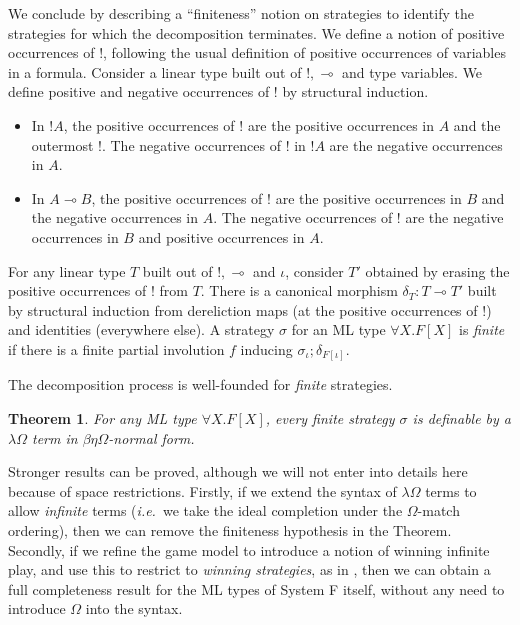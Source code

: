 \documentclass[a4paper,11pt]{article}
\newtheorem{theorem}[proposition]{Theorem}
\newcommand{\ie}{\textit{i.e.}\ }
\newcommand{\linimpl}{\multimap}
\newcommand{\lambdaomega}{\lambda\Omega}
\begin{document}
We conclude by describing a ``finiteness'' notion on strategies to
identify the strategies for which the decomposition terminates. We
define a notion of positive occurrences of $!$, following the
usual definition of positive occurrences of variables in a
formula. Consider a linear type built out of $!, \linimpl$ and
type variables.  We define positive and negative occurrences of
$!$ by structural induction.
\begin{itemize}
\item In $!A$, the positive occurrences of $!$ are the positive
occurrences in
$A$ and the outermost $!$.  The negative occurrences of $!$ in
$!A$ are the negative occurrences in $A$.
\item In $A \linimpl B$, the positive occurrences of $!$ are the
positive occurrences in $B$ and the negative occurrences in $A$.
The negative occurrences of $!$ are the negative occurrences in
$B$ and positive occurrences in $A$.
\end{itemize}
For any linear type $T$ built out of $!, \linimpl$ and $\iota$, consider $T'$ obtained by erasing the positive occurrences
of $!$ from $T$.  There is a canonical morphism $\delta_T : T \linimpl T'$
built by structural induction from dereliction maps (at the positive
occurrences of $!$) and identities (everywhere else). A strategy
$\sigma$ for an ML type $\forall X. F[X]$ is \emph{finite} if
there is a finite partial involution $f$ inducing
$\sigma_{\iota} ; \delta_{F[\iota ]}$.

The decomposition process is well-founded for \emph{finite}
strategies.
\begin{theorem}
For any ML type $\forall X. F[X]$, every finite strategy $\sigma$
is definable by a $\lambdaomega$ term in $\beta\eta\Omega$-normal form.
\end{theorem}

Stronger results can be proved, although we will not enter into details
here because of space restrictions. Firstly, if we extend the syntax of
$\lambda\Omega$ terms to allow \emph{infinite} terms (\ie we take the
ideal completion under the $\Omega$-match ordering), then we can
remove the finiteness hypothesis in the Theorem.
Secondly, if we refine the game model to introduce a notion of
winning infinite play, and use this to restrict to \emph{winning
strategies}, as in \cite{Abr96}, then we can obtain a full completeness
result for the ML types of System F itself, without any need to introduce $\Omega$
into the syntax.
 
\end{document}
